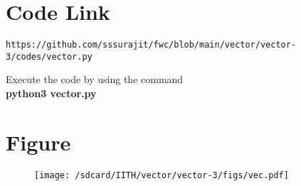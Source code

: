 \documentclass[journal,12pt,twocolumn]{IEEEtran}
\begin{document}
\section{\textbf{Code Link}}
\begin{lstlisting}
https://github.com/sssurajit/fwc/blob/main/vector/vector-3/codes/vector.py
\end{lstlisting}
Execute the code by using the command\\
\textbf{python3 vector.py}\\
\section{\textbf{Figure}}
\begin{figure}[!ht]
    \centering
\texttt{[image: /sdcard/IITH/vector/vector-3/figs/vec.pdf]}
\caption{}
\label{fig:vec}
\end{figure}
\end{document}

